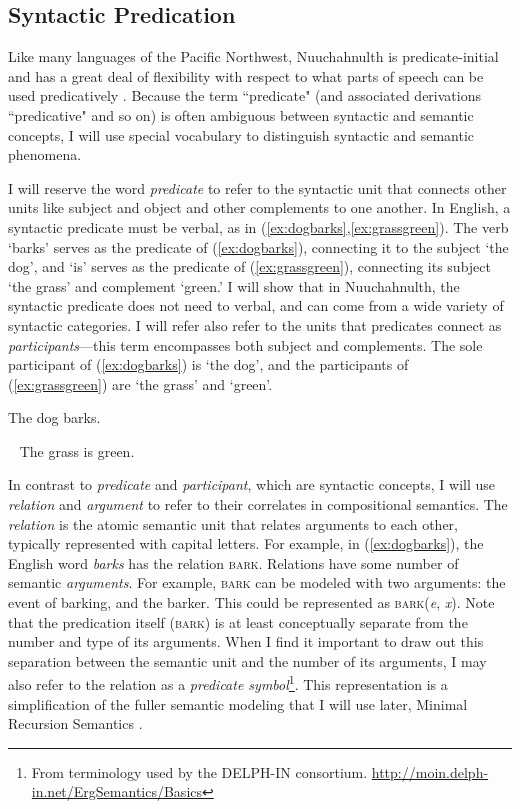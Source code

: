 \subsection{Syntactic Predication} \label{sec:predp}

Like many languages of the Pacific Northwest, Nuuchahnulth is predicate-initial and has a great deal of flexibility with respect to what parts of speech can be used predicatively \citep{jacobsen1979}. Because the term ``predicate" (and associated derivations ``predicative" and so on) is often ambiguous between syntactic and semantic concepts, I will use special vocabulary to distinguish syntactic and semantic phenomena.

I will reserve the word \textit{predicate} to refer to the syntactic unit that connects other units like subject and object and other complements to one another. In English, a syntactic predicate must be verbal, as in (\ref{ex:dogbarks},\ref{ex:grassgreen}). The verb `barks' serves as the predicate of (\ref{ex:dogbarks}), connecting it to the subject `the dog', and `is' serves as the predicate of (\ref{ex:grassgreen}), connecting its subject `the grass' and complement `green.' I will show that in Nuuchahnulth, the syntactic predicate does not need to verbal, and can come from a wide variety of syntactic categories. I will refer also refer to the units that predicates connect as \textit{participants}---this term encompasses both subject and complements. The sole participant of (\ref{ex:dogbarks}) is `the dog', and the participants of (\ref{ex:grassgreen}) are `the grass' and `green'.

\ex \label{ex:dogbarks}
The dog barks.
\xe

\ex~ \label{ex:grassgreen}
The grass is green.
\xe

In contrast to \textit{predicate} and \textit{participant}, which are syntactic concepts, I will use \textit{relation} and \textit{argument} to refer to their correlates in compositional semantics. The \textit{relation} is the atomic semantic unit that relates arguments to each other, typically represented with capital letters. For example, in (\ref{ex:dogbarks}), the English word \textit{barks} has the relation \textsc{bark}. Relations have some number of semantic \textit{arguments}. For example, \textsc{bark} can be modeled with two arguments: the event of barking, and the barker. This could be represented as \textsc{bark}(\textit{e}, \textit{x}). Note that the predication itself (\textsc{bark}) is at least conceptually separate from the number and type of its arguments. When I find it important to draw out this separation between the semantic unit and the number of its arguments, I may also refer to the relation as a \textit{predicate symbol}\footnote{From terminology used by the DELPH-IN consortium. \url{http://moin.delph-in.net/ErgSemantics/Basics}}. This representation is a simplification of the fuller semantic modeling that I will use later, Minimal Recursion Semantics \citep{copestake2005}.

